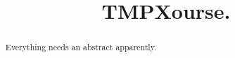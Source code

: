 \documentclass{xourse}
\title{TMPXourse.}
\begin{document}
\begin{abstract}
    Everything needs an abstract apparently.
\end{abstract}
\maketitle

\end{document}
